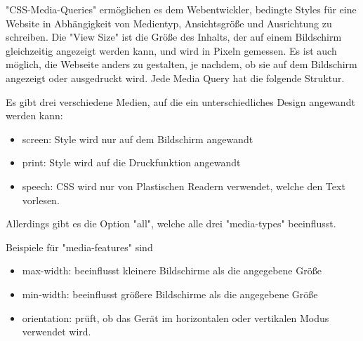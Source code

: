 
"CSS-Media-Queries" ermöglichen es dem Webentwickler, bedingte Styles für eine Website in Abhängigkeit von Medientyp, Ansichtsgröße und Ausrichtung zu schreiben. Die "View Size" ist die Größe des Inhalts, der auf einem Bildschirm gleichzeitig angezeigt werden kann, und wird in Pixeln gemessen. Es ist auch möglich, die Webseite anders zu gestalten, je nachdem, ob sie auf dem Bildschirm angezeigt oder ausgedruckt wird. Jede Media Query hat die folgende Struktur. 


Es gibt drei verschiedene Medien, auf die ein unterschiedliches Design angewandt werden kann: 
\begin{itemize}
    \item screen: Style wird nur auf dem Bildschirm angewandt
    \item print: Style wird auf die Druckfunktion angewandt 
    \item speech: CSS wird nur von Plastischen Readern verwendet, welche den Text vorlesen. 
\end{itemize}
Allerdings gibt es die Option "all", welche alle drei "media-types" beeinflusst. \cite{w3MediaQueries}

Beispiele für "media-features" sind

\begin{itemize}
    \item max-width: beeinflusst kleinere Bildschirme als die angegebene Größe
    \item min-width: beeinflusst größere Bildschirme als die angegebene Größe 
    \item orientation: prüft, ob das Gerät im horizontalen oder vertikalen Modus verwendet wird.
\end{itemize}
